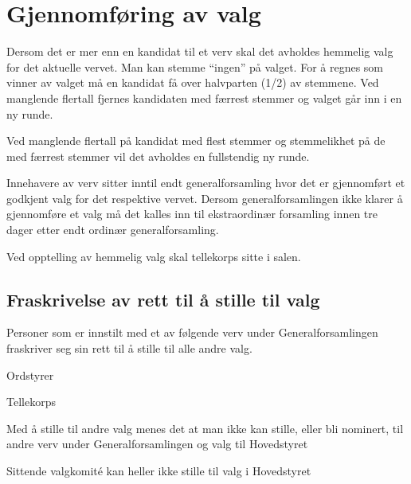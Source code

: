 \section{Gjennomføring av valg}{
\vspace{23pt}
Dersom det er mer enn en kandidat til et verv skal det avholdes hemmelig valg for det aktuelle vervet. Man kan stemme “ingen” på valget. For å regnes som vinner av valget må en kandidat få over halvparten (1/2) av stemmene. Ved manglende flertall fjernes kandidaten med færrest stemmer og valget går inn i en ny runde.\newline
					
Ved manglende flertall på kandidat med flest stemmer og stemmelikhet på de med færrest stemmer vil det avholdes en fullstendig ny runde.\newline

Innehavere av verv sitter inntil endt generalforsamling hvor det er gjennomført et godkjent valg for det respektive vervet. Dersom generalforsamlingen ikke klarer å gjennomføre et valg må det kalles inn til ekstraordinær forsamling innen tre dager etter endt ordinær generalforsamling.\newline

Ved opptelling av hemmelig valg skal tellekorps sitte i salen.


	\subsection{Fraskrivelse av rett til å stille til valg} {
	Personer som er innstilt med et av følgende verv under Generalforsamlingen fraskriver seg sin rett til å stille til alle andre valg.
	\begin{liste}
		\item Ordstyrer
		\item Tellekorps
	\end{liste}
	Med å stille til andre valg menes det at man ikke kan stille, eller bli nominert, til andre verv under Generalforsamlingen og valg til Hovedstyret \newline

    Sittende valgkomité kan heller ikke stille til valg i Hovedstyret

	}
}
